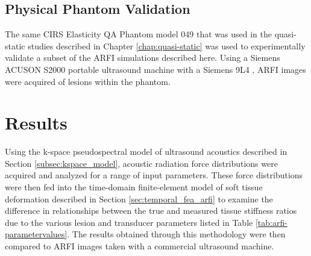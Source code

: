 		\subsection{Physical Phantom Validation}
			The same CIRS Elasticity QA Phantom model 049 that was used in the quasi-static studies described in Chapter \ref{chap:quasi-static} was used to experimentally validate a subset of the ARFI simulations described here. Using a Siemens ACUSON S2000  portable ultrasound machine with a Siemens 9L4 , ARFI images were acquired of lesions within the phantom. 

	\section{Results}
		Using the k-space pseudospectral model of ultrasound acoustics described in Section \ref{subsec:kspace_model}, acoustic radiation force distributions were acquired and analyzed for a range of input parameters. These force distributions were then fed into the time-domain finite-element model of soft tissue deformation described in Section \ref{sec:temporal_fea_arfi} to examine the difference in relationships between the true and measured tissue stiffness ratios due to the various lesion and transducer parameters listed in Table \ref{tab:arfi-parametervalues}. The results obtained through this methodology were then compared to ARFI images taken with a commercial ultrasound machine. 

